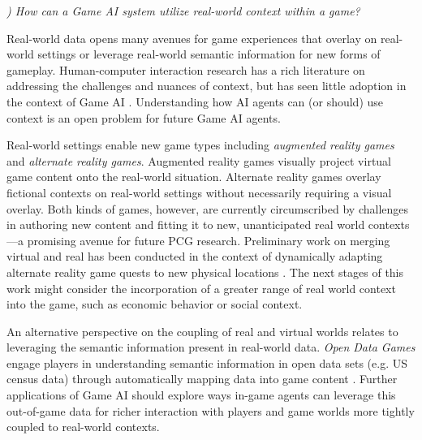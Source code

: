 \documentclass[conference]{IEEEtran}
\newcounter{questionno}
\newcommand{\subsubsectionx}[1]{{\em {\arabic{questionno}) #1}}
	\addtocounter{questionno}{1}
	}
\begin{document}
\subsubsectionx{How can a Game AI system utilize real-world context within a game?}
%
Real-world data opens many avenues for game experiences that overlay on real-world settings or leverage real-world semantic information for new forms of gameplay. Human-computer interaction research has a rich literature on addressing the challenges and nuances of context, but has seen little adoption in the context of Game AI \cite{hong2009:context-aware-computing}. 
Understanding how AI agents can (or should) use context is an open problem for future Game AI agents.

Real-world settings enable new game types including {\em augmented reality games} and {\em alternate reality games}. 
Augmented reality games visually project virtual game content onto the real-world situation.
Alternate reality games overlay fictional contexts on real-world settings without necessarily requiring a visual overlay. 
Both kinds of games, however, are currently circumscribed by challenges in authoring new content and fitting it to new, unanticipated real world contexts---a promising avenue for future PCG research. 
Preliminary work on merging virtual and real has been conducted in the context of dynamically adapting alternate reality game quests to new physical locations \cite{macvean2011:wequest, gustafsson2006:backseatplayground}.
The next stages of this work might consider the incorporation of a greater range of real world context into the game, such as economic behavior or social context.

An alternative perspective on the coupling of real and virtual worlds relates to leveraging the semantic information present in real-world data. 
{\em Open Data Games} engage players in understanding semantic information in open data sets (e.g. US census data) through automatically mapping data into game content \cite{friberger2013:datagames}. 
Further applications of Game AI should explore ways in-game agents can leverage this out-of-game data for richer interaction with players and game worlds more tightly coupled to real-world contexts.
\end{document}
